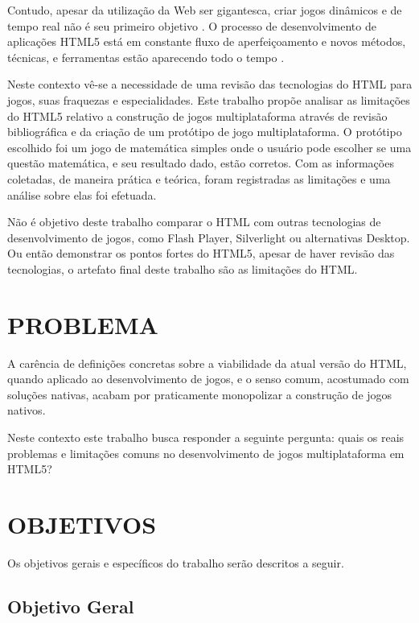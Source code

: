 Contudo, apesar da utilização da Web ser gigantesca, criar
jogos dinâmicos e de tempo real não é seu primeiro objetivo
\textsc{\autocite{html5mostwanted}}. O processo de desenvolvimento de
aplicações HTML5 está em constante fluxo de aperfeiçoamento e novos
métodos, técnicas, e ferramentas estão aparecendo todo o tempo
\textsc{\autocite{crossPlatformMobileGame}}.

Neste contexto vê-se a necessidade de uma revisão das tecnologias do
HTML para jogos, suas fraquezas e especialidades. Este trabalho propõe
analisar as limitações do HTML5 relativo a construção de jogos
multiplataforma através de revisão bibliográfica e da criação de um
protótipo de jogo multiplataforma. O protótipo escolhido foi um jogo
de matemática simples onde o usuário pode escolher se uma questão
matemática, e seu resultado dado, estão corretos. Com as informações
coletadas, de maneira prática e teórica, foram registradas as limitações
e uma análise sobre elas foi efetuada.

Não é objetivo deste trabalho comparar o HTML com outras tecnologias
de desenvolvimento de jogos, como Flash Player, Silverlight ou
alternativas Desktop. Ou então demonstrar os pontos fortes do HTML5,
apesar de haver revisão das tecnologias, o artefato final deste
trabalho são as limitações do HTML.

\section{PROBLEMA}
A carência de definições concretas sobre a viabilidade da atual
versão do HTML, quando aplicado ao desenvolvimento de jogos, e o senso
comum, acostumado com soluções nativas, acabam por praticamente
monopolizar a construção de jogos nativos.

Neste contexto este trabalho busca responder a seguinte pergunta: quais os
reais problemas e limitações comuns no desenvolvimento de jogos
multiplataforma em HTML5?

\section{OBJETIVOS}

Os objetivos gerais e específicos do trabalho serão descritos a seguir.

\subsection{Objetivo Geral}

